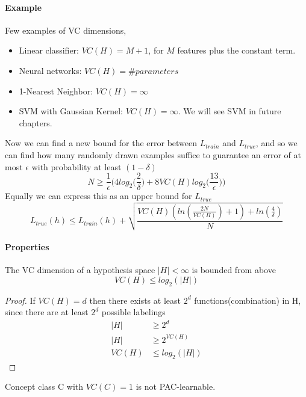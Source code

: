 \documentclass[main.tex]{subfiles}
\begin{document}
\paragraph{Example} Few examples of VC dimensions,
\begin{itemize}
    \item Linear classifier: $VC(H) = M+1$, for $M$ features plus the constant term.
    \item Neural networks: $VC(H) = \#parameters$
    \item 1-Nearest Neighbor: $VC(H) = \infty$
    \item SVM with Gaussian Kernel: $VC(H) = \infty$. We will see SVM in future chapters.
\end{itemize}
Now we can find a new bound for the error between $L_{train}$ and $L_{true}$, and so we can find how many randomly drawn examples suffice to guarantee an error of at most $\epsilon$ with probability at least $(1-\delta)$
\begin{equation}
    N \geq \frac{1}{\epsilon} \bigg( 4log_2 \bigg( \frac{2}{\delta} \bigg) + 8VC(H) log_2 \bigg( \frac{13}{\epsilon} \bigg) \bigg)
\end{equation}
Equally we can express this as an upper bound for $L_{true}$
\begin{equation}
    L_{true}(h) \leq L_{train}(h) + \sqrt{\frac{VC(H)(ln(\frac{2N}{VC(H)})+1)+ln(\frac{4}{\delta})}{N}}
\end{equation}

\paragraph{Properties}
\begin{theorem}
The VC dimension of a hypothesis space $|H| < \infty$ is bounded from above
\begin{equation*}
    VC(H) \leq log_2(|H|)
\end{equation*}
\end{theorem}
\begin{proof}
If $VC(H)=d$ then there exists at least $2^d$ functions(combination) in H, since there are at least $2^d$ possible labelings
\begin{align*}
    |H|&\geq 2^d \\
    |H|&\geq 2^{VC(H)} \\
    VC(H)&\leq log_2(|H|)
\end{align*}
\end{proof}
\begin{theorem}
Concept class C with $VC(C) = 1$ is not PAC-learnable.
\end{theorem}

\newpage
\end{document}
